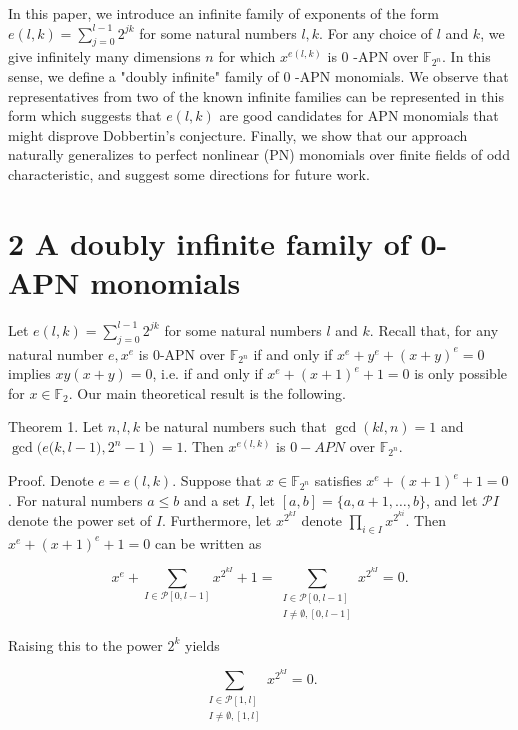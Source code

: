 \documentclass[10pt]{article}
\begin{document}
In this paper, we introduce an infinite family of exponents of the form $e(l, k)=\sum_{j=0}^{l-1} 2^{j k}$ for some natural numbers $l, k$. For any choice of $l$ and $k$, we give infinitely many dimensions $n$ for which $x^{e(l, k)}$ is 0 -APN over $\mathbb{F}_{2^{n}}$. In this sense, we define a "doubly infinite" family of 0 -APN monomials. We observe that representatives from two of the known infinite families can be represented in this form which suggests that $e(l, k)$ are good candidates for APN monomials that might disprove Dobbertin's conjecture. Finally, we show that our approach naturally generalizes to perfect nonlinear (PN) monomials over finite fields of odd characteristic, and suggest some directions for future work.

\section*{2 A doubly infinite family of 0-APN monomials}
Let $e(l, k)=\sum_{j=0}^{l-1} 2^{j k}$ for some natural numbers $l$ and $k$. Recall that, for any natural number $e, x^{e}$ is 0-APN over $\mathbb{F}_{2^{n}}$ if and only if $x^{e}+y^{e}+(x+y)^{e}=0$ implies $x y(x+y)=0$, i.e. if and only if $x^{e}+(x+1)^{e}+1=0$ is only possible for $x \in \mathbb{F}_{2}$. Our main theoretical result is the following.

Theorem 1. Let $n, l, k$ be natural numbers such that $\operatorname{gcd}(k l, n)=1$ and $\operatorname{gcd}(e(k, l- \left.1), 2^{n}-1\right)=1$. Then $x^{e(l, k)}$ is $0-A P N$ over $\mathbb{F}_{2^{n}}$.

Proof. Denote $e=e(l, k)$. Suppose that $x \in \mathbb{F}_{2^{n}}$ satisfies $x^{e}+(x+1)^{e}+1=0$. For natural numbers $a \leq b$ and a set $I$, let $[a, b]=\{a, a+1, \ldots, b\}$, and let $\mathcal{P} I$ denote the power set of $I$. Furthermore, let $x^{2^{k I}}$ denote $\prod_{i \in I} x^{2^{k i}}$. Then $x^{e}+(x+1)^{e}+1=0$ can be written as


\begin{equation*}
x^{e}+\sum_{I \in \mathcal{P}[0, l-1]} x^{2^{k I}}+1=\sum_{\substack{I \in \mathcal{P}[0, l-1] \\ I \neq \emptyset,[0, l-1]}} x^{2^{k I}}=0 . \tag{1}
\end{equation*}


Raising this to the power $2^{k}$ yields

$$
\sum_{\substack{I \in \mathcal{P}[1, l] \\ I \neq \emptyset,[1, l]}} x^{2^{k I}}=0 .
$$
\end{document}
